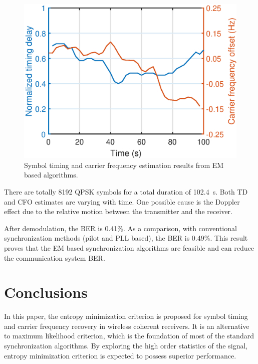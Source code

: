 \documentclass[journal,comsoc]{IEEEtran}
\begin{document}
\begin{figure}[ht]
\centering
\includegraphics[width=3 in]{pic/per_exp.eps}
\caption{Symbol timing and carrier frequency estimation results from EM based algorithms.}
\label{fig:per_exp} 
\end{figure} 

There are totally 8192 QPSK symbols for a total duration of 102.4~s.
Both TD and CFO estimates are varying with time.
One possible cause is the Doppler effect due to the relative motion between the transmitter and the receiver.

After demodulation, the BER is 0.41\%.
As a comparison, with conventional synchronization methods (pilot and PLL based), the BER is 0.49\%.
This result proves that the EM based synchronization algorithms are feasible and can reduce the communication system BER.



\section{Conclusions}
\label{sec:conc}
In this paper, the entropy minimization criterion is proposed for symbol timing and carrier frequency recovery in wireless coherent receivers.
It is an alternative to maximum likelihood criterion, which is the foundation of most of the standard synchronization algorithms. 
By exploring the high order statistics of the signal, entropy minimization criterion is expected to possess superior performance. 
\end{document}
